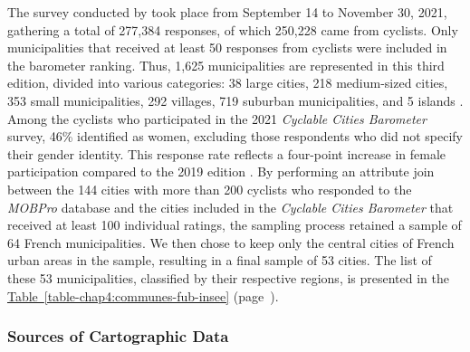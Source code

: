 \begin{refsegment}
The survey conducted by \textcolor{blue}{\textcite{fub_barometre_2021}} took place from September 14 to November 30, 2021, gathering a total of 277,384 responses, of which 250,228 came from cyclists. Only municipalities that received at least 50 responses from cyclists were included in the barometer ranking. Thus, 1,625 municipalities are represented in this third edition, divided into various categories: 38 large cities, 218 medium-sized cities, 353 small municipalities, 292 villages, 719 suburban municipalities, and 5 islands \textcolor{blue}{\autocite[7]{vermeulen_barometre_2022}}. Among the cyclists who participated in the 2021 \textsl{Cyclable Cities Barometer} survey, 46\% identified as women, excluding those respondents who did not specify their gender identity. This response rate reflects a four-point increase in female participation compared to the 2019 edition \textcolor{blue}{\autocite[10]{vermeulen_barometre_2022}}. By performing an attribute join between the 144 cities with more than 200 cyclists who responded to the \textsl{MOBPro} database and the cities included in the \textsl{Cyclable Cities Barometer} that received at least 100 individual ratings, the sampling process retained a sample of 64 French municipalities. We then chose to keep only the central cities of French urban areas in the sample, resulting in a final sample of 53 cities. The list of these 53 municipalities, classified by their respective regions, is presented in the \hyperref[table-chap4:communes-fub-insee]{Table~\ref{table-chap4:communes-fub-insee}} (page~\pageref{table-chap4:communes-fub-insee}). %

\subsubsection*{Sources of Cartographic Data
    \label{chap4:source-cartographique}
    }


\end{refsegment}
